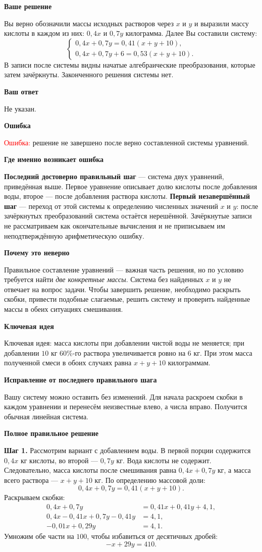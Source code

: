 \documentclass[12pt,a4paper]{article}
\newcommand{\subblock}[1]{\vspace{4pt}\noindent\textbf{#1}\par}
\begin{document}
\subblock{Ваше решение}
Вы верно обозначили массы исходных растворов через $x$ и $y$ и выразили
массу кислоты в каждом из них: $0{,}4x$ и $0{,}7y$ килограмма.
Далее Вы составили систему:
\[
\begin{cases}
0{,}4x+0{,}7y=0{,}41(x+y+10),\\
0{,}4x+0{,}7y+6=0{,}53(x+y+10).
\end{cases}
\]
В записи после системы видны начатые алгебраические преобразования,
которые затем зачёркнуты. Законченного решения системы нет.

\subblock{Ваш ответ}
Не указан.

\subblock{Ошибка}
\textcolor{red}{Ошибка:} решение не завершено после верно составленной системы уравнений.

\subblock{Где именно возникает ошибка}
\textbf{Последний достоверно правильный шаг} --- система двух уравнений,
приведённая выше. Первое уравнение описывает долю кислоты после
добавления воды, второе --- после добавления раствора кислоты.
\textbf{Первый незавершённый шаг} --- переход от этой системы к
определению численных значений $x$ и $y$: после зачёркнутых
преобразований система остаётся нерешённой.
Зачёркнутые записи не рассматриваем как окончательные вычисления и
не приписываем им неподтверждённую арифметическую ошибку.

\subblock{Почему это неверно}
Правильное составление уравнений --- важная часть решения,
но по условию требуется найти \emph{две конкретные массы}.
Система без найденных $x$ и $y$ не отвечает на вопрос задачи.
Чтобы завершить решение, необходимо раскрыть скобки, привести
подобные слагаемые, решить систему и проверить найденные массы
в обеих ситуациях смешивания.

\subblock{Ключевая идея}
\textcolor{blue!60!black}{Ключевая идея:} масса кислоты при добавлении
чистой воды не меняется; при добавлении $10$ кг $60\%$-го раствора
увеличивается ровно на $6$ кг. При этом масса полученной смеси
в обоих случаях равна $x+y+10$ килограммам.

\subblock{Исправление от последнего правильного шага}
Вашу систему можно оставить без изменений. Для начала раскроем
скобки в каждом уравнении и перенесём неизвестные влево,
а числа вправо. Получится обычная линейная система.

\subblock{Полное правильное решение}
\textbf{Шаг 1.} Рассмотрим вариант с добавлением воды.
В первой порции содержится $0{,}4x$ кг кислоты,
во второй --- $0{,}7y$ кг. Вода кислоты не содержит.
Следовательно, масса кислоты после смешивания равна
$0{,}4x+0{,}7y$ кг, а масса всего раствора --- $x+y+10$ кг.
По определению массовой доли:
\[
0{,}4x+0{,}7y=0{,}41(x+y+10).
\]
Раскрываем скобки:
\begin{align*}
0{,}4x+0{,}7y&=0{,}41x+0{,}41y+4{,}1,\\
0{,}4x-0{,}41x+0{,}7y-0{,}41y&=4{,}1,\\
-0{,}01x+0{,}29y&=4{,}1.
\end{align*}
Умножим обе части на $100$, чтобы избавиться от десятичных дробей:
\[
\boxed{-x+29y=410.} \tag{1}
\]
\end{document}
